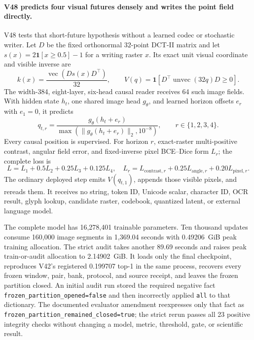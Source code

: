 \documentclass[11pt]{article}
\begin{document}
\paragraph{V48 predicts four visual futures densely and writes the point
field directly.}
V48 tests that short-future hypothesis without a learned codec or stochastic
writer. Let $D$ be the fixed orthonormal $32$-point DCT-II matrix and let
$s(x)=2\mathbf 1[x\geq0.5]-1$ for a writing raster $x$. Its exact unit visual
coordinate and visible inverse are
\[
k(x)=\frac{\operatorname{vec}(D s(x)D^\top)}{32},\qquad
V(q)=\mathbf 1\!\left[D^\top\operatorname{unvec}(32q)D\geq0\right].
\]
The width-384, eight-layer, six-head causal reader receives 64 such image
fields. With hidden state $h_t$, one shared image head $g_\theta$, and learned
horizon offsets $e_r$ with $e_1=0$, it predicts
\[
q_{t,r}=\frac{g_\theta(h_t+e_r)}
{\max(\lVert g_\theta(h_t+e_r)\rVert_2,10^{-8})},
\qquad r\in\{1,2,3,4\}.
\]
Every causal position is supervised. For horizon $r$, exact-raster
multi-positive contrast, angular field error, and fixed-inverse pixel
BCE--Dice form $L_r$; the complete loss is
\[
L= L_1+0.5L_2+0.25L_3+0.125L_4,
\quad
L_r=L_{\mathrm{contrast},r}+0.25L_{\mathrm{angle},r}
     +0.20L_{\mathrm{pixel},r}.
\]
The ordinary deployed step emits $V(q_{t,1})$, appends those visible pixels,
and rereads them. It receives no string, token ID, Unicode scalar, character
ID, OCR result, glyph lookup, candidate raster, codebook, quantized latent, or
external language model.

The complete model has 16,278,401 trainable parameters. Ten thousand updates
consume 160,000 image segments in 1,369.04 seconds with 0.49206~GiB peak
training allocation. The strict audit takes another 89.69 seconds and raises
peak train-or-audit allocation to 2.14902~GiB. It loads only the final
checkpoint, reproduces V42's registered 0.199707 top-1 in the same process,
recovers every frozen window, pair, bank, protocol, and source receipt, and
leaves the frozen partition closed. An initial audit run stored the required
negative fact \texttt{frozen\_partition\_opened=false} and then incorrectly
applied \texttt{all} to that dictionary. The documented evaluator amendment
reexpresses only that fact as
\texttt{frozen\_partition\_remained\_closed=true}; the strict rerun passes all
23 positive integrity checks without changing a model, metric, threshold,
gate, or scientific result.
\end{document}
